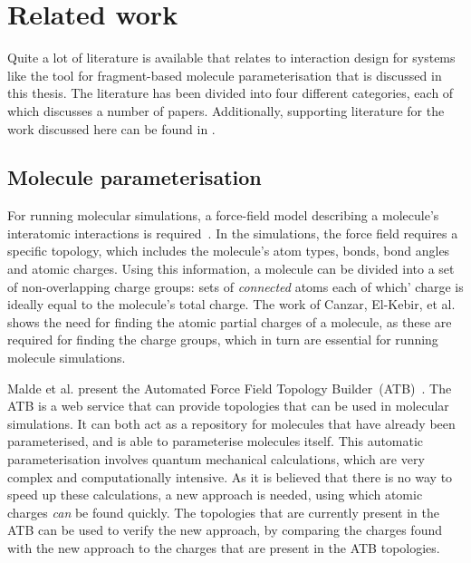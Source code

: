 \chapter{Related work}

Quite a lot of literature is available that relates to interaction design for systems like the tool for fragment-based molecule parameterisation that is discussed in this thesis. The literature has been divided into four different categories, each of which discusses a number of papers. Additionally, supporting literature for the work discussed here can be found in .


\section{Molecule parameterisation}
For running molecular simulations, a force-field model describing a molecule's interatomic interactions is required~\cite{canzar2012charge}. In the simulations, the force field requires a specific topology, which includes the molecule's atom types, bonds, bond angles and atomic charges. Using this information, a molecule can be divided into a set of non-overlapping charge groups: sets of \emph{connected} atoms each of which' charge is ideally equal to the molecule's total charge. The work of Canzar, El-Kebir, et al. shows the need for finding the atomic partial charges of a molecule, as these are required for finding the charge groups, which in turn are essential for running molecule simulations.

Malde et al. present the Automated Force Field Topology Builder~(ATB)~\cite{malde2011automated}. The ATB is a web service that can provide topologies that can be used in molecular simulations. It can both act as a repository for molecules that have already been parameterised, and is able to parameterise molecules itself. This automatic parameterisation involves quantum mechanical calculations, which are very complex and computationally intensive. As it is believed that there is no way to speed up these calculations, a new approach is needed, using which atomic charges \emph{can} be found quickly. The topologies that are currently present in the ATB can be used to verify the new approach, by comparing the charges found with the new approach to the charges that are present in the ATB topologies.


